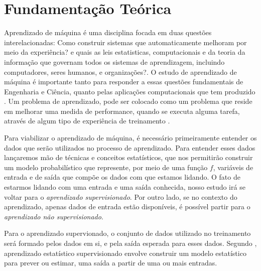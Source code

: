 \chapter{Fundamentação Teórica}

Aprendizado de máquina é uma disciplina focada em duas questões interelacionadas: Como construir sistemas que automaticamente melhoram por meio da experiência? e quais as leis estatisticas,
computacionais e da teoria da informação que governam todos os sistemas de aprendizagem, incluindo computadores, seres humanos, e organizações?. O estudo de aprendizado de máquina é importante tanto
para responder a essas questões fundamentais de Engenharia e Ciência, quanto pelas aplicações computacionais que tem produzido \cite{Jordan}.
Um problema de aprendizado, pode ser colocado como um problema que reside em melhorar uma medida de performance, quando se executa alguma tarefa, através de algum tipo de experiência de treinamento \cite{Jordan}.

Para viabilizar o aprendizado de máquina, é necessário primeiramente entender os dados que serão utilizados no processo de aprendizado. Para entender esses dados
lançaremos mão de técnicas e conceitos estatísticos, que nos permitirão construir um modelo probabilístico que represente, por meio de uma função $f$, variáveis de entrada e de saída que compõe os dados com que estamos lidando. O fato de estarmos lidando com uma entrada e uma saída conhecida, nosso estudo irá se voltar para o \textit{aprendizado supervisionado}. Por outro lado, se no contexto do aprendizado, apenas dados de entrada estão disponíveis, é possível partir para o \textit{aprendizado não supervisionado}.

Para o aprendizado supervionado, o conjunto de dados utilizado no treinamento será formado pelos dados em si, e pela saída esperada para esses dados\cite{Louridas}. Segundo \cite{James}, aprendizado estatístico supervisionado envolve construir um modelo estatístico para prever ou estimar, uma saída a partir de uma ou mais entradas.



